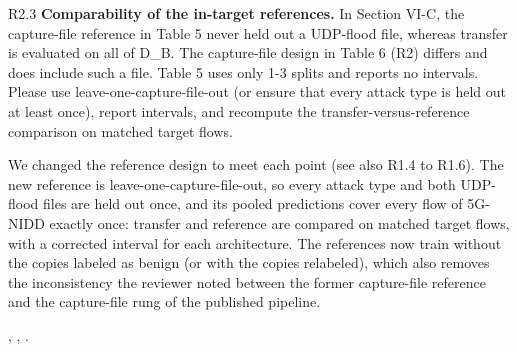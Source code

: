 \label{rv:R2.3}
\begin{concern}{R2.3}
\textbf{Comparability of the in-target references.} In Section VI-C, the capture-file reference in Table 5 never held out a UDP-flood file, whereas transfer is evaluated on all of D\_B. The capture-file design in Table 6 (R2) differs and does include such a file. Table 5 uses only 1-3 splits and reports no intervals. Please use leave-one-capture-file-out (or ensure that every attack type is held out at least once), report intervals, and recompute the transfer-versus-reference comparison on matched target flows.
\end{concern}
\response We changed the reference design to meet each point (see also R1.4 to R1.6). The new reference is leave-one-capture-file-out, so every attack type and both UDP-flood files are held out once, and its pooled predictions cover every flow of 5G-NIDD exactly once: transfer and reference are compared on matched target flows, with a corrected interval for each architecture. The references now train without the copies labeled as benign (or with the copies relabeled), which also removes the inconsistency the reviewer noted between the former capture-file reference and the capture-file rung of the published pipeline.

\action {}, , .
